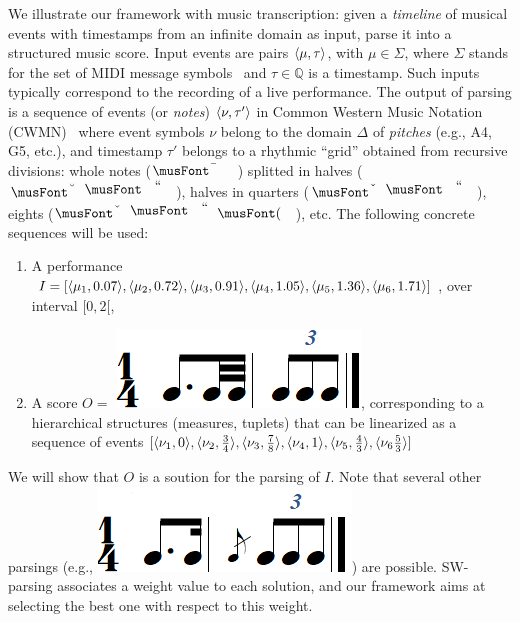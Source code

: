 \begin{example}\label{ex:running}
We
illustrate our framework with music transcription: given
a \emph{timeline} of musical events with timestamps from an infinite
domain as input, parse it
into a structured music score. Input events
are pairs $\< \mu, \tau>$, with $\mu \in \Sigma$, where $\Sigma$ stands for the
set of MIDI message symbols~\cite{?}
and  $\tau \in \mathbb{Q}$ is a timestamp. Such inputs typically correspond
to the recording of a live performance. The output of parsing
is a sequence of events (or \emph{notes}) $\< \nu, \tau'>$   in
Common Western Music Notation (CWMN)~\cite{Gould11Notation}
where event symbols $\nu$ belong to the domain $\Delta$
of \emph{pitches} (e.g., A4, G5, etc.), and timestamp $\tau'$
belongs to a rhythmic ``grid'' obtained from recursive divisions:
whole notes ($\musWhole$) splitted in halves ($\musHalf$), halves
in quarters ($\musQuarter$), eights ($\musEighth$), etc.
The following concrete sequences
will be used:
\begin{enumerate}
  \item A performance  $I = [ \<\mu_1, 0.07>, \<\mu_2, 0.72>, \<\mu_3, 0.91>, \<\mu_4, 1.05>, \<\mu_5, 1.36>, \<\mu_6, 1.71>]$,
     over interval $[0,2[$,
  \item A score $O =$ \includegraphics[scale=0.20]{pictures/score5.png}, corresponding to
      a hierarchical structures (measures, tuplets) that can be linearized as a sequence of events
      $[\<\nu_1,0>, \<\nu_2,\frac{3}{4}>, \<\nu_3,\frac{7}{8}>, \<\nu_4,1>, \<\nu_5,\frac{4}{3}>, \<\nu_6\frac{5}{3}>]$
\end{enumerate}
\smallskip

We will show that $O$ is a soution for the
parsing of $I$. Note that several other parsings (e.g.,
\includegraphics[scale=0.20]{pictures/score4.png}) are possible.
SW-parsing associates a weight value
to each solution, and our framework
aims at selecting the best one with respect to this weight.
\endex
\end{example}
